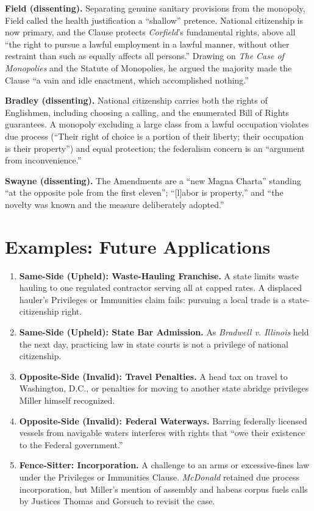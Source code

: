 \documentclass[12pt]{article}
\begin{document}
\textbf{Field (dissenting).} Separating genuine sanitary provisions from the monopoly, Field called the health justification a ``shallow'' pretence. National citizenship is now primary, and the Clause protects \textit{Corfield}'s fundamental rights, above all ``the right to pursue a lawful employment in a lawful manner, without other restraint than such as equally affects all persons.'' Drawing on \textit{The Case of Monopolies} and the Statute of Monopolies, he argued the majority made the Clause ``a vain and idle enactment, which accomplished nothing.''

\textbf{Bradley (dissenting).} National citizenship carries both the rights of Englishmen, including choosing a calling, and the enumerated Bill of Rights guarantees. A monopoly excluding a large class from a lawful occupation violates due process (``Their right of choice is a portion of their liberty; their occupation is their property'') and equal protection; the federalism concern is an ``argument from inconvenience.''

\textbf{Swayne (dissenting).} The Amendments are a ``new Magna Charta'' standing ``at the opposite pole from the first eleven''; ``[l]abor is property,'' and ``the novelty was known and the measure deliberately adopted.''

\section{Examples: Future Applications}

\begin{enumerate}
\item \textbf{Same-Side (Upheld): Waste-Hauling Franchise.} A state limits waste hauling to one regulated contractor serving all at capped rates. A displaced hauler's Privileges or Immunities claim fails: pursuing a local trade is a state-citizenship right.
\item \textbf{Same-Side (Upheld): State Bar Admission.} As \textit{Bradwell v. Illinois} held the next day, practicing law in state courts is not a privilege of national citizenship.
\item \textbf{Opposite-Side (Invalid): Travel Penalties.} A head tax on travel to Washington, D.C., or penalties for moving to another state abridge privileges Miller himself recognized.
\item \textbf{Opposite-Side (Invalid): Federal Waterways.} Barring federally licensed vessels from navigable waters interferes with rights that ``owe their existence to the Federal government.''
\item \textbf{Fence-Sitter: Incorporation.} A challenge to an arms or excessive-fines law under the Privileges or Immunities Clause. \textit{McDonald} retained due process incorporation, but Miller's mention of assembly and habeas corpus fuels calls by Justices Thomas and Gorsuch to revisit the case.
\end{enumerate}
\end{document}
